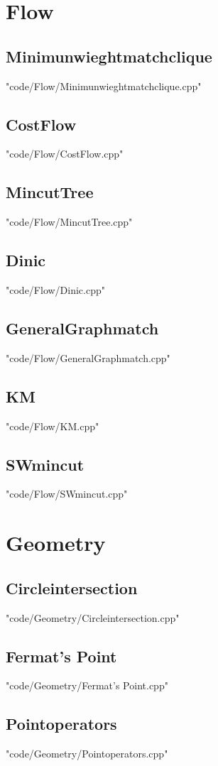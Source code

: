 \documentclass [8pt,a4paper,twocolumn]{article}
\begin{document}
\section{Flow}
\subsection{Minimunwieghtmatchclique}
 {"code/Flow/Minimunwieghtmatchclique.cpp"}
\subsection{CostFlow}
 {"code/Flow/CostFlow.cpp"}
\subsection{MincutTree}
 {"code/Flow/MincutTree.cpp"}
\subsection{Dinic}
 {"code/Flow/Dinic.cpp"}
\subsection{GeneralGraphmatch}
 {"code/Flow/GeneralGraphmatch.cpp"}
\subsection{KM}
 {"code/Flow/KM.cpp"}
\subsection{SWmincut}
 {"code/Flow/SWmincut.cpp"}
\section{Geometry}
\subsection{Circleintersection}
 {"code/Geometry/Circleintersection.cpp"}
\subsection{Fermat's Point}
 {"code/Geometry/Fermat's Point.cpp"}
\subsection{Pointoperators}
 {"code/Geometry/Pointoperators.cpp"}
\end{document}
